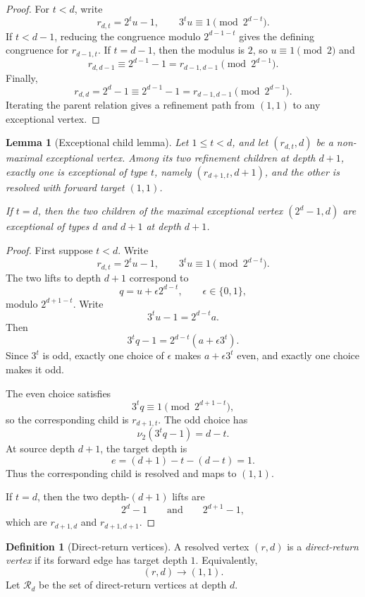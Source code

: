 \documentclass[11pt]{article}
\newtheorem{lemma}[theorem]{Lemma}
\theoremstyle{definition}
\newtheorem{definition}[theorem]{Definition}
\theoremstyle{remark}
\newcommand{\nuu}{\nu_2}
\newcommand{\Rcal}{\mathcal R}
\begin{document}
\begin{proof}
For $t<d$, write
\[
r_{d,t}=2^tu-1,
\qquad
3^tu\equiv1\pmod {2^{d-t}}.
\]
If $t<d-1$, reducing the congruence modulo $2^{d-1-t}$ gives the defining congruence for $r_{d-1,t}$.  If $t=d-1$, then the modulus is $2$, so $u\equiv1\pmod2$ and
\[
r_{d,d-1}\equiv2^{d-1}-1=r_{d-1,d-1}\pmod {2^{d-1}}.
\]
Finally,
\[
r_{d,d}=2^d-1\equiv2^{d-1}-1=r_{d-1,d-1}\pmod {2^{d-1}}.
\]
Iterating the parent relation gives a refinement path from $(1,1)$ to any exceptional vertex.
\end{proof}

\begin{lemma}[Exceptional child lemma]\label{lem:child}
Let $1\le t<d$, and let $(r_{d,t},d)$ be a non-maximal exceptional vertex.  Among its two refinement children at depth $d+1$, exactly one is exceptional of type $t$, namely $(r_{d+1,t},d+1)$, and the other is resolved with forward target $(1,1)$.

If $t=d$, then the two children of the maximal exceptional vertex $(2^d-1,d)$ are exceptional of types $d$ and $d+1$ at depth $d+1$.
\end{lemma}

\begin{proof}
First suppose $t<d$.  Write
\[
r_{d,t}=2^tu-1,
\qquad
3^tu\equiv1\pmod {2^{d-t}}.
\]
The two lifts to depth $d+1$ correspond to
\[
q=u+\epsilon 2^{d-t},
\qquad
\epsilon\in\{0,1\},
\]
modulo $2^{d+1-t}$.  Write
\[
3^tu-1=2^{d-t}a.
\]
Then
\[
3^tq-1=2^{d-t}(a+\epsilon3^t).
\]
Since $3^t$ is odd, exactly one choice of $\epsilon$ makes $a+\epsilon3^t$ even, and exactly one choice makes it odd.

The even choice satisfies
\[
3^tq\equiv1\pmod {2^{d+1-t}},
\]
so the corresponding child is $r_{d+1,t}$.  The odd choice has
\[
\nuu(3^tq-1)=d-t.
\]
At source depth $d+1$, the target depth is
\[
e=(d+1)-t-(d-t)=1.
\]
Thus the corresponding child is resolved and maps to $(1,1)$.

If $t=d$, then the two depth-$(d+1)$ lifts are
\[
2^d-1
\qquad\text{and}\qquad
2^{d+1}-1,
\]
which are $r_{d+1,d}$ and $r_{d+1,d+1}$.
\end{proof}

\begin{definition}[Direct-return vertices]
A resolved vertex $(r,d)$ is a \emph{direct-return vertex} if its forward edge has target depth $1$.  Equivalently,
\[
(r,d)\to(1,1).
\]
Let $\Rcal_d$ be the set of direct-return vertices at depth $d$.
\end{definition}
\end{document}
